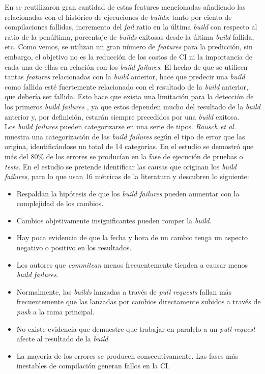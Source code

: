 En \cite{6} se reutilizaron gran cantidad de estas features mencionadas añadiendo las
relacionadas con el histórico de ejecuciones de \textit{builds}: tanto por ciento de compilaciones
fallidas, incremento del \textit{fail} ratio en la última \textit{build} con respecto al ratio
de la penúltima, porcentaje de \textit{builds} exitosas desde la última \textit{build} fallida,
etc. Como vemos, se utilizan un gran número de \textit{features} para la predicción, sin embargo,
el objetivo no es la reducción de los costos de CI ni la  importancia de cada una de
ellas en relación con los \textit{build failures}. El hecho de que se utilicen tantas
\textit{features} relacionadas con la \textit{build} anterior, hace que predecir una
\textit{build} como fallida esté fuertemente relacionado con el resultado de la \textit{build}
anterior, que debería ser fallida. Esto hace que exista una limitación para la detección de los
primeros \textit{build failures} \cite{2}, ya que estos dependen mucho del resultado de la
\textit{build} anterior y, por definición, estarán siempre precedidos por una \textit{build}
exitosa.\\

Los \textit{build failures} pueden categorizarse en una serie de tipos. \textit{Rausch et al.}
\cite{13} muestra una categorización de las \textit{build failures} según el tipo de error
que las origina, identificándose un total de 14 categorías. En el estudio se demostró que más
del 80\% de los errores se producían en la fase de ejecución de pruebas o \textit{tests}. En
el estudio se pretende identificar las causas que originan los \textit{build failures}, para lo
que usan 16 métricas de la literatura y descubren lo siguiente:

\begin{itemize}
      \item Respaldan la hipótesis de que los \textit{build failures} pueden aumentar con la 
      complejidad de los cambios.
      \item Cambios objetivamente insignificantes pueden romper la \textit{build}.
      \item Hay poca evidencia de que la fecha y hora de un cambio tenga un aspecto negativo o
      positivo en los resultados.
      \item Los autores que \textit{commitean} menos frecuentemente tienden a causar menos
      \textit{build failures}.
      \item Normalmente, las \textit{builds} lanzadas a través de \textit{pull requests} fallan
      más frecuentemente que las lanzadas por cambios directamente subidos a través de
      \textit{push} a la rama principal.
      \item No existe evidencia que demuestre que trabajar en paralelo a un \textit{pull request}
      afecte al resultado de la \textit{build}.
      \item La mayoría de los errores se producen consecutivamente. Las fases más inestables de
      compilación generan fallos en la CI.
\end{itemize}

